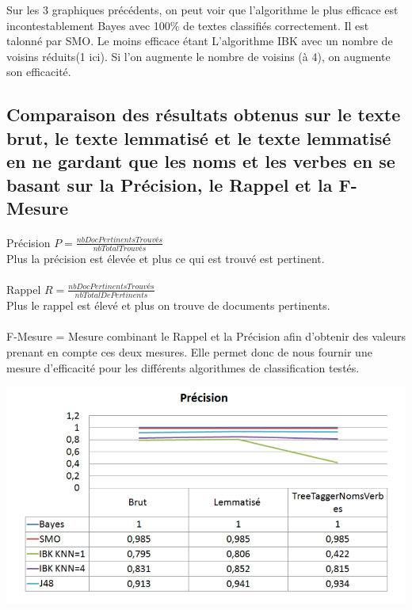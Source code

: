 \documentclass[a4paper,11pt]{article}
\begin{document}
Sur les 3 graphiques précédents, on peut voir que l’algorithme le plus efficace est incontestablement Bayes avec 100\% de textes classifiés correctement. Il est talonné par SMO. Le moins efficace étant L’algorithme IBK avec un nombre de voisins réduits(1 ici). Si l’on augmente le nombre de voisins (à 4), on augmente son efficacité.

\subsection{Comparaison des résultats obtenus sur le texte brut, le texte lemmatisé et le texte lemmatisé en ne gardant que les noms et les verbes en se basant sur la Précision, le Rappel et la F-Mesure}
\paragraph{}
Précision $ P =  \frac{nbDocPertinentsTrouvés}{nbTotalTrouvés}$ \\
Plus la précision est élevée et plus ce qui est trouvé est pertinent.
\paragraph{}
Rappel $ R = \frac{nbDocPertinentsTrouvés}{nbTotalDePertinents}$ \\
Plus le rappel est élevé et plus on trouve de documents pertinents.
\paragraph{}
F-Mesure = Mesure combinant le Rappel et la Précision afin d’obtenir des valeurs prenant en compte ces deux mesures. Elle permet donc de nous fournir une mesure d'efficacité pour les différents algorithmes de classification testés.


\begin{center}
\includegraphics[scale=0.4]{precision.png}
\end{center}
\end{document}
